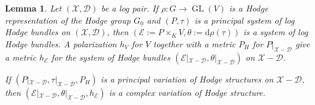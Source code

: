 \documentclass[a4paper]{amsart}
\newtheorem{lemma}[theorem]{Lemma}
\theoremstyle{definition}
\def\gl{\mathop{\mathrm{GL}}\nolimits}
\begin{document}
\begin{lemma}\label{VHS-lemma}
Let $(\mathscr{X},\mathscr{D})$ be a log pair. If $\rho:G\to\gl(V)$ is a Hodge representation of the Hodge group $G_0$ and $(P,\tau)$ is a principal system of log Hodge bundles on $(\mathscr{X},\mathscr{D})$, then $(\mathcal{E}:=P\times_KV,\theta:=\mathrm{d}\rho(\tau))$ is a system of log Hodge bundles. A polarization $h_V$ for $V$ together with a metric $P_H$ for $P|_{\mathscr{X}-\mathscr{D}}$ give a metric $h_{\mathcal{E}}$ for the system of Hodge bundles $(\mathcal{E}|_{\mathscr{X}-\mathscr{D}},\theta|_{\mathscr{X}-\mathscr{D}})$ on $\mathscr{X}-\mathscr{D}$. 

If $(P|_{\mathscr{X}-\mathscr{D}},\tau|_{\mathscr{X}-\mathscr{D}},P_H)$ is a principal variation of Hodge structures on $\mathscr{X}-\mathscr{D}$, then $(\mathcal{E}|_{\mathscr{X}-\mathscr{D}},\theta|_{\mathscr{X}-\mathscr{D}},h_{\mathcal{E}})$ is a complex variation of Hodge structure.
\end{lemma}
\end{document}
